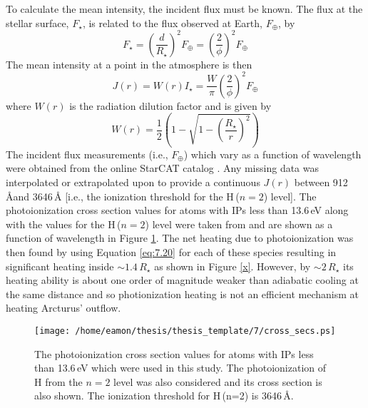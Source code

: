 To calculate the mean intensity, the incident flux must be known. The flux at the stellar surface, $F_{\star}$, is related to the flux observed at Earth, $F_{\oplus}$, by
\begin{equation}
F_{\star}= \left(\frac{d}{R_{\star}}\right)^2F_{\oplus}=\left(\frac{2}{\phi}\right)^2F_{\oplus}
\end{equation}
The mean intensity at a point in the atmosphere is then
\begin{equation}
J(r)=W(r)I_{\star} =\frac{W}{\pi}\left(\frac{2}{\phi}\right)^2F_{\oplus}
\end{equation}
where $W(r)$ is the radiation dilution factor and is given by
\begin{equation}
W(r)=\frac{1}{2}\left(1 - \sqrt{1-\left(\frac{R_{\star}}{r}\right)^2} \right)
\end{equation}
The incident flux measurements (i.e., $F_{\oplus}$) which vary as a function of wavelength were obtained from the online StarCAT catalog \citep{ayres_2010}. Any missing data was interpolated or extrapolated upon to provide a continuous $J(r)$ between 912\,\AA and 3646\,\AA\,\,[i.e., the ionization threshold for the H\,($n=2$) level]. The photoionization cross section values for atoms with IPs less than 13.6\,eV along with the values for the H\,($n=2$) level were taken from \cite{mathisen_1984} and are shown as a function of wavelength in Figure \ref{fig:7.2}. The net heating due to photoionization was then found by using Equation \ref{eq:7.20} for each of these species resulting in significant heating inside $\sim 1.4\,R_{\star}$ as shown in Figure \ref{x}. However, by $\sim 2\,R_{\star}$ its heating ability is about one order of magnitude weaker than adiabatic cooling at the same distance and so photionization heating is not an efficient mechanism at heating Arcturus' outflow.
\begin{figure}[!ht]
\centering 
         \texttt{[image: /home/eamon/thesis/thesis\_template/7/cross\_secs.ps]}
\caption[]{The photoionization cross section values for atoms with IPs less than 13.6\,eV which were used in this study. The photoionization of H from the $n=2$ level was also considered and its cross section is also shown. The ionization threshold for H\,(n=2) is 3646\,\AA .}
\label{fig:7.2}
\end{figure}

